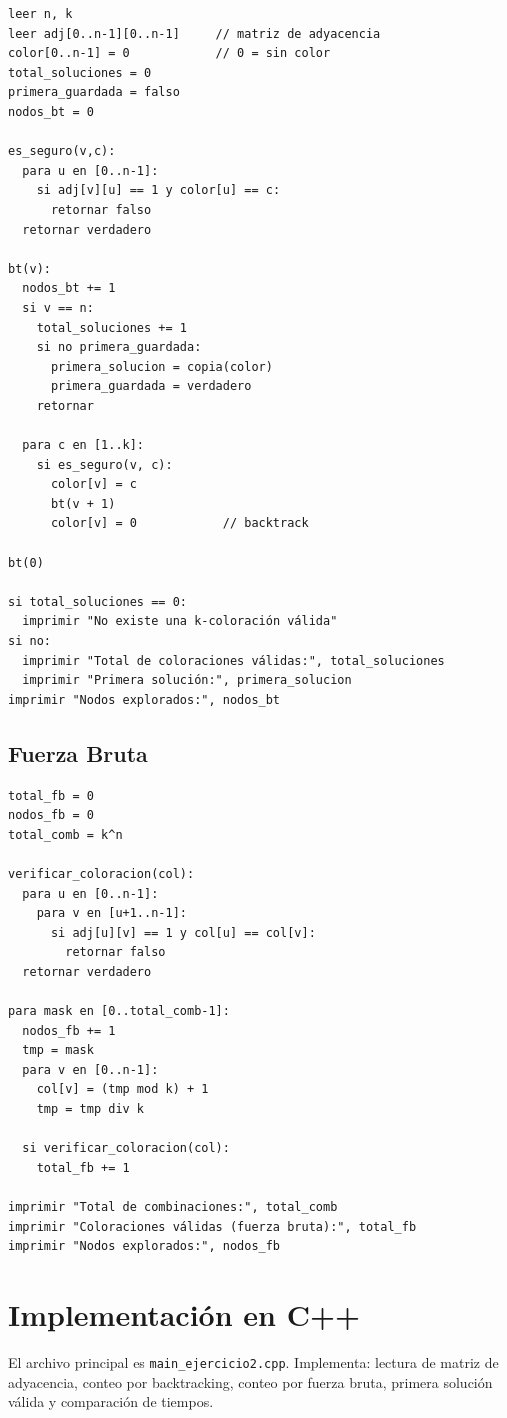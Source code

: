 \documentclass[12pt,a4paper]{article}
\begin{document}
\begin{lstlisting}[style=pseudo]
leer n, k
leer adj[0..n-1][0..n-1]     // matriz de adyacencia
color[0..n-1] = 0            // 0 = sin color
total_soluciones = 0
primera_guardada = falso
nodos_bt = 0

es_seguro(v,c):
  para u en [0..n-1]:
    si adj[v][u] == 1 y color[u] == c:
      retornar falso
  retornar verdadero

bt(v):
  nodos_bt += 1
  si v == n:
    total_soluciones += 1
    si no primera_guardada:
      primera_solucion = copia(color)
      primera_guardada = verdadero
    retornar

  para c en [1..k]:
    si es_seguro(v, c):
      color[v] = c
      bt(v + 1)
      color[v] = 0            // backtrack

bt(0)

si total_soluciones == 0:
  imprimir "No existe una k-coloración válida"
si no:
  imprimir "Total de coloraciones válidas:", total_soluciones
  imprimir "Primera solución:", primera_solucion
imprimir "Nodos explorados:", nodos_bt
\end{lstlisting}

\subsection{Fuerza Bruta}
\begin{lstlisting}[style=pseudo]
total_fb = 0
nodos_fb = 0
total_comb = k^n

verificar_coloracion(col):
  para u en [0..n-1]:
    para v en [u+1..n-1]:
      si adj[u][v] == 1 y col[u] == col[v]:
        retornar falso
  retornar verdadero

para mask en [0..total_comb-1]:
  nodos_fb += 1
  tmp = mask
  para v en [0..n-1]:
    col[v] = (tmp mod k) + 1
    tmp = tmp div k

  si verificar_coloracion(col):
    total_fb += 1

imprimir "Total de combinaciones:", total_comb
imprimir "Coloraciones válidas (fuerza bruta):", total_fb
imprimir "Nodos explorados:", nodos_fb
\end{lstlisting}

\section{Implementación en C++}

El archivo principal es \texttt{main\_ejercicio2.cpp}. Implementa:
lectura de matriz de adyacencia, conteo por backtracking, conteo por fuerza
bruta, primera solución válida y comparación de tiempos.
\end{document}
